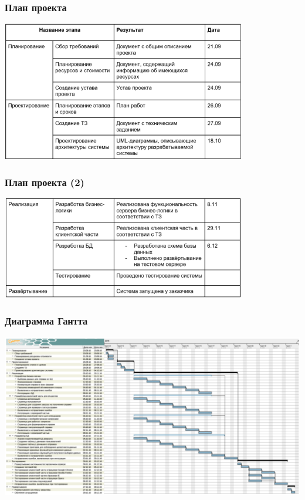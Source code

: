 \documentclass[xetex,mathserif,serif]{beamer}
\begin{document}
	\begin{frame}
		\frametitle{План проекта}
		\begin{center}
			\includegraphics[width=0.8\textwidth]{plan1.png}
		\end{center}
	\end{frame}

	\begin{frame}
		\frametitle{План проекта (2)}
		\begin{center}
			\includegraphics[width=0.8\textwidth]{plan2.png}
		\end{center}
	\end{frame}

	\begin{frame}
		\frametitle{Диаграмма Гантта}
		\begin{center}
			\includegraphics[width=\textwidth]{ganttChart.png}
		\end{center}
	\end{frame}
\end{document}

